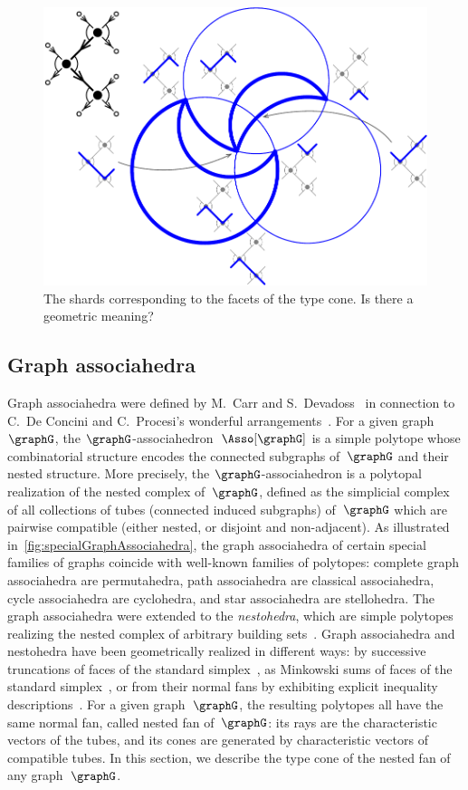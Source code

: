 \documentclass{amsart}
\theoremstyle{definition}
\newcommand{\darkblue}{\color{darkblue}} %
\newcommand{\defn}[1]{\textsl{\darkblue #1}} %
\begin{document}
\begin{figure}[t]
	\capstart
	\centerline{\includegraphics[scale=.6]{fan}}
	\caption{The shards corresponding to the facets of the type cone. Is there a geometric meaning?}
	\label{fig:fanShards}
\end{figure}

\subsection{Graph associahedra}

Graph associahedra were defined by M.~Carr and S.~Devadoss~\cite{CarrDevadoss} in connection to C.~De Concini and C.~Procesi's wonderful arrangements~\cite{DeConciniProcesi}.
For a given graph~$\graphG$, the $\graphG$-associahedron~$\Asso[\graphG]$ is a simple polytope whose combinatorial structure encodes the connected subgraphs of~$\graphG$ and their nested structure.
More precisely, the $\graphG$-associahedron is a polytopal realization of the nested complex of~$\graphG$, defined as the simplicial complex of all collections of tubes (connected induced subgraphs) of~$\graphG$ which are pairwise compatible (either nested, or disjoint and non-adjacent).
As illustrated in~\cref{fig:specialGraphAssociahedra}, the graph associahedra of certain special families of graphs coincide with well-known families of polytopes: complete graph associahedra are permutahedra, path associahedra are classical associahedra, cycle associahedra are cyclohedra, and star associahedra are stellohedra.
The graph associahedra were extended to the \defn{nestohedra}, which are simple polytopes realizing the nested complex of arbitrary building sets~\cite{Postnikov, FeichtnerSturmfels}.
Graph associahedra and nestohedra have been geometrically realized in different ways: by successive truncations of faces of the standard simplex~\cite{CarrDevadoss}, as Minkowski sums of faces of the standard simplex~\cite{Postnikov, FeichtnerSturmfels}, or from their normal fans by exhibiting explicit inequality descriptions~\cite{Devadoss, Zelevinsky}.
For a given graph~$\graphG$, the resulting polytopes all have the same normal fan, called nested fan of~$\graphG$: its rays are the characteristic vectors of the tubes, and its cones are generated by characteristic vectors of compatible tubes.
In this section, we describe the type cone of the nested fan of any graph~$\graphG$.
\end{document}
